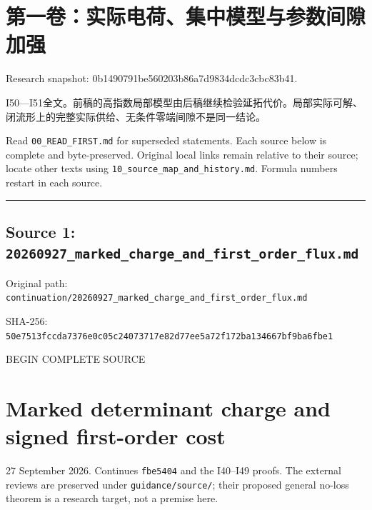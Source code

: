 \documentclass[
  10pt,
]{article}
\author{}
\date{}
\begin{document}
\hypertarget{ux7b2cux4e00ux5377ux5b9eux9645ux7535ux8377ux96c6ux4e2dux6a21ux578bux4e0eux53c2ux6570ux95f4ux9699ux52a0ux5f3a}{%
\section{第一卷：实际电荷、集中模型与参数间隙加强}\label{ux7b2cux4e00ux5377ux5b9eux9645ux7535ux8377ux96c6ux4e2dux6a21ux578bux4e0eux53c2ux6570ux95f4ux9699ux52a0ux5f3a}}

Research snapshot: 0b1490791be560203b86a7d9834dcdc3cbc83b41.

I50---I51全文。前稿的高指数局部模型由后稿继续检验延拓代价。局部实际可解、闭流形上的完整实际供给、无条件零端间隙不是同一结论。

Read \nolinkurl{00_READ_FIRST.md} for superseded statements. Each source below is
complete and byte-preserved. Original local links remain relative to
their source; locate other texts using \nolinkurl{10_source_map_and_history.md}.
Formula numbers restart in each source.

\begin{center}\rule{0.5\linewidth}{0.5pt}\end{center}

\hypertarget{source-1-20260927_marked_charge_and_first_order_flux.md}{%
\subsection{Source 1:
\nolinkurl{20260927_marked_charge_and_first_order_flux.md}}\label{source-1-20260927_marked_charge_and_first_order_flux.md}}

Original path:
\nolinkurl{continuation/20260927_marked_charge_and_first_order_flux.md}

SHA-256:
\nolinkurl{50e7513fccda7376e0c05c24073717e82d77ee5a72f172ba134667bf9ba6fbe1}

BEGIN COMPLETE SOURCE

\hypertarget{marked-determinant-charge-and-signed-first-order-cost}{%
\section{Marked determinant charge and signed first-order
cost}\label{marked-determinant-charge-and-signed-first-order-cost}}

27 September 2026. Continues \texttt{fbe5404} and the I40--I49 proofs.
The external reviews are preserved under \nolinkurl{guidance/source/};
their proposed general no-loss theorem is a research target, not a
premise here.
\end{document}
